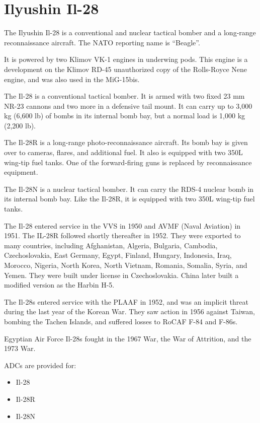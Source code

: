 \section*{Ilyushin Il-28}

The Ilyushin Il-28 is a conventional and nuclear tactical bomber and a long-range reconnaissance aircraft. The NATO reporting name is “Beagle”.

It is powered by two Klimov VK-1 engines in underwing pods. This engine is a development on the Klimov RD-45 unauthorized copy of the Rolls-Royce Nene engine, and was also used in the MiG-15bis.

The Il-28 is a conventional tactical bomber. It is armed with two fixed 23 mm NR-23 cannons and two more in a defensive tail mount. It can carry up to 3,000 kg (6,600 lb) of bombs in its internal bomb bay, but a normal load is 1,000 kg (2,200 lb).

The Il-28R is a long-range photo-reconnaissance aircraft. Its bomb bay is given over to cameras, flares, and additional fuel. It also is equipped with two 350L wing-tip fuel tanks. One of the forward-firing guns is replaced by reconnaissance equipment.

The Il-28N is a nuclear tactical bomber. It can carry the RDS-4 nuclear bomb in its internal bomb bay. Like the Il-28R, it is equipped with two 350L wing-tip fuel tanks.

The Il-28 entered service in the VVS in 1950 and AVMF (Naval Aviation) in 1951. The IL-28R followed shortly thereafter in 1952. They were exported to many countries, including Afghanistan, Algeria, Bulgaria, Cambodia, Czechoslovakia, East Germany, Egypt, Finland, Hungary, Indonesia, Iraq, Morocco, Nigeria, North Korea, North Vietnam, Romania, Somalia, Syria, and Yemen. They were built under license in Czechoslovakia. China later built a modified version as the Harbin H-5.

The Il-28s entered service with the PLAAF in 1952, and was an implicit threat during the last year of the Korean War. They saw action in 1956 against Taiwan, bombing the Tachen Islands, and suffered losses to RoCAF F-84 and F-86s.

Egyptian Air Force Il-28s fought in the 1967 War, the War of Attrition, and the 1973 War.

ADCs are provided for:
\begin{itemize}
    \item Il-28
    \item Il-28R
    \item Il-28N
\end{itemize}
